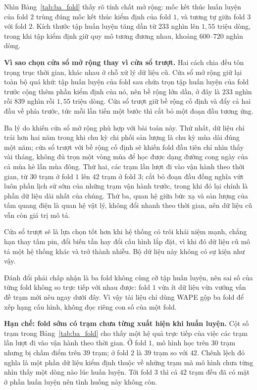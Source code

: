 \documentclass[12pt, a4paper]{report}
\begin{document}
Nhìn Bảng~\ref{tab:ba_fold} thấy rõ tính chất mở rộng: mốc kết thúc huấn luyện của fold
$2$ trùng đúng mốc kết thúc kiểm định của fold $1$, và tương tự giữa fold $3$ với fold
$2$. Kích thước tập huấn luyện tăng dần từ $233$ nghìn lên $1{,}55$ triệu dòng, trong
khi tập kiểm định giữ quy mô tương đương nhau, khoảng $600$--$720$ nghìn dòng.

\textbf{Vì sao chọn cửa sổ mở rộng thay vì cửa sổ trượt.} Hai cách chia đều tôn trọng
trục thời gian, khác nhau ở chỗ xử lý dữ liệu cũ. Cửa sổ mở rộng giữ lại toàn bộ quá khứ:
tập huấn luyện của fold sau chứa trọn tập huấn luyện của fold trước cộng thêm phần kiểm
định của nó, nên bề rộng lớn dần, ở đây là $233$ nghìn rồi $839$ nghìn rồi $1{,}55$ triệu
dòng. Cửa sổ trượt giữ bề rộng cố định và đẩy cả hai đầu về phía trước, tức mỗi lần tiến
một bước thì cắt bỏ một đoạn đầu tương ứng.

Ba lý do khiến cửa sổ mở rộng phù hợp với bài toán này. Thứ nhất, dữ liệu chỉ trải hơn
hai năm trong khi chu kỳ chi phối sản lượng là chu kỳ mùa dài đúng một năm; cửa sổ trượt
với bề rộng cố định sẽ khiến fold đầu tiên chỉ nhìn thấy vài tháng, không đủ trọn một
vòng mùa để học được dạng đường cong ngày của cả mùa hè lẫn mùa đông. Thứ hai, các trạm
lần lượt đi vào vận hành theo thời gian, từ $30$ trạm ở fold $1$ lên $42$ trạm ở fold $3$;
cắt bỏ đoạn đầu đồng nghĩa vứt luôn phần lịch sử sớm của những trạm vận hành trước, trong
khi đó lại chính là phần dữ liệu dài nhất của chúng. Thứ ba, quan hệ giữa bức xạ và sản
lượng của tấm quang điện là quan hệ vật lý, không đổi nhanh theo thời gian, nên dữ liệu
cũ vẫn còn giá trị mô tả.

Cửa sổ trượt sẽ là lựa chọn tốt hơn khi hệ thống có trôi khái niệm mạnh, chẳng hạn thay
tấm pin, đổi biến tần hay đổi cấu hình lắp đặt, vì khi đó dữ liệu cũ mô tả một hệ thống
khác và trở thành nhiễu. Bộ dữ liệu này không có sự kiện như vậy.

Đánh đổi phải chấp nhận là ba fold không cùng cỡ tập huấn luyện, nên sai số của từng fold
không so trực tiếp với nhau được: fold $1$ vừa ít dữ liệu vừa vướng vấn đề trạm mới nêu
ngay dưới đây. Vì vậy tài liệu chỉ dùng WAPE gộp ba fold để xếp hạng cấu hình, không đọc
riêng con số của một fold.

\textbf{Hạn chế: fold sớm có trạm chưa từng xuất hiện khi huấn luyện.} Cột số trạm trong
Bảng~\ref{tab:ba_fold} cho thấy một hệ quả trực tiếp của việc các trạm lần lượt đi vào vận
hành theo thời gian. Ở fold $1$, mô hình học trên $30$ trạm nhưng bị chấm điểm trên $39$
trạm; ở fold $2$ là $39$ trạm so với $42$. Chênh lệch đó nghĩa là một phần dữ liệu kiểm định
thuộc về những trạm mà mô hình chưa từng nhìn thấy một dòng nào lúc huấn luyện. Tới
fold $3$ thì cả $42$ trạm đều đã có mặt ở phần huấn luyện nên tình huống này không còn.
\end{document}
